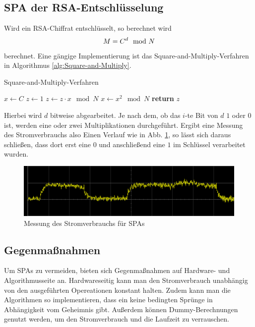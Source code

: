 \subsection{SPA der RSA-Entschlüsselung}
Wird ein RSA-Chiffrat entschlüsselt, so berechnet wird \[M
  =C^d \mod N\] berechnet. Eine gängige Implementierung ist das
Square-and-Multiply-Verfahren in Algorithmus \ref{alg:Square-and-Multiply}. 
\begin{algorithm}[!h]
\caption{Square-and-Multiply-Verfahren}
\label{alg:Square-and-Multiply}
\begin{algorithmic}

  \State $x \gets C$
  \State $z \gets 1$
      \State $z \gets z \cdot x \mod N$
    \EndIf
    \State $x \gets x^2 \mod N$
  \EndFor
  \State \textbf{return} $z$
\EndProcedure
\end{algorithmic}
\end{algorithm}

Hierbei wird $d$ bitweise abgearbeitet. Je nach dem, ob das $i$-te Bit
von $d$ $1$ oder $0$ ist, werden eine oder zwei Multiplikationen
durchgeführt. Ergibt eine Messung des Stromverbrauchs also Einen Verlauf
wie in Abb. \ref{abb:power-attack}, so lässt sich daraus schließen, dass
dort erst eine $0$ und anschließend eine $1$ im Schlüssel verarbeitet wurden.

\begin{figure}[h]
  \centering
  \includegraphics[width=\textwidth]{images/Power_attack}
  \caption{Messung des Stromverbrauchs für SPAs}
  \label{abb:power-attack}
\end{figure}

\subsection{Gegenmaßnahmen}
Um SPAs zu vermeiden, bieten sich Gegenmaßnahmen auf Hardware- und
Algorithmusseite an. Hardwareseitig kann man den Stromverbrauch
unabhängig von den ausgeführten Opereationen konstant halten. Zudem kann
man die Algorithmen so implementieren, dass ein keine bedingten Sprünge
in Abhängigkeit vom Geheimnis gibt. Außerdem können Dummy-Berechnungen
genutzt werden, um den Stromverbrauch und die Laufzeit  zu verrauschen.


